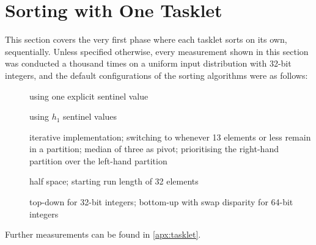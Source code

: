 \section{Sorting with One Tasklet}

This section covers the very first phase where each tasklet sorts on its own, \ie{} sequentially.
Unless specified otherwise, every measurement shown in this section was conducted a thousand times on a uniform input distribution with 32-bit integers, and the default configurations of the sorting algorithms were as follows:
\begin{description}
	\item[\IS{}]
	using one explicit sentinel value

	\item[\ShS{}]
	using \(h_1\) sentinel values

	\item[\QS{}]
	iterative implementation;
	switching to \IS{} whenever 13 elements or less remain in a partition;
	median of three as pivot;
	prioritising the right-hand partition over the left-hand partition

	\item[\MS{}]
	half space;
	starting run length of 32 elements

	\item[\HS{}]
	top-down for 32-bit integers;
	bottom-up with swap disparity for 64-bit integers
\end{description}
Further measurements can be found in \cref{apx:tasklet}.






